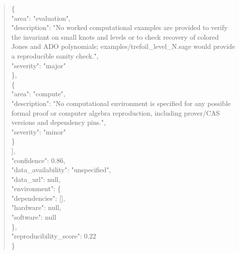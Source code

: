 \documentclass[11pt]{article}
\begin{document}
\begin{quote}
    \{\\
      "area": "evaluation",\\
      "description": "No worked computational examples are provided to verify the invariant on small knots and levels or to check recovery of colored Jones and ADO polynomials; examples/trefoil\_level\_N.sage would provide a reproducible sanity check.",\\
      "severity": "major"\\
    \},\\
    \{\\
      "area": "compute",\\
      "description": "No computational environment is specified for any possible formal proof or computer algebra reproduction, including prover/CAS versions and dependency pins.",\\
      "severity": "minor"\\
    \}\\
  ],\\
  "confidence": 0.86,\\
  "data\_availability": "unspecified",\\
  "data\_url": null,\\
  "environment": \{\\
    "dependencies": [],\\
    "hardware": null,\\
    "software": null\\
  \},\\
  "reproducibility\_score": 0.22\\
\}\\
\end{quote}
\end{document}
